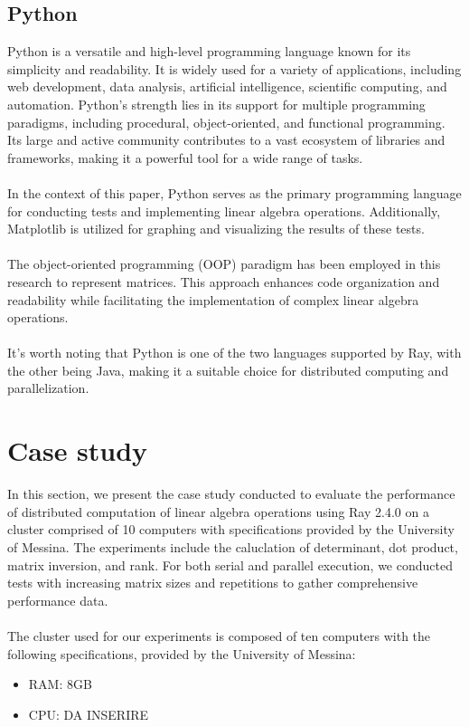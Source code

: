 \subsection{Python}
Python is a versatile and high-level programming language known for its simplicity and readability. It is widely used for a variety of applications, including web development, data analysis, artificial intelligence, scientific computing, and automation. Python's strength lies in its support for multiple programming paradigms, including procedural, object-oriented, and functional programming. Its large and active community contributes to a vast ecosystem of libraries and frameworks, making it a powerful tool for a wide range of tasks.
\\\\
In the context of this paper, Python serves as the primary programming language for conducting tests and implementing linear algebra operations. Additionally, Matplotlib is utilized for graphing and visualizing the results of these tests.
\\\\
The object-oriented programming (OOP) paradigm has been employed in this research to represent matrices. This approach enhances code organization and readability while facilitating the implementation of complex linear algebra operations.
\\\\
It's worth noting that Python is one of the two languages supported by Ray, with the other being Java, making it a suitable choice for distributed computing and parallelization.

\section{Case study}

In this section, we present the case study conducted to evaluate the performance of distributed computation of linear algebra operations using Ray 2.4.0 on a cluster comprised of 10 computers with specifications provided by the University of Messina. The experiments include the caluclation of determinant, dot product, matrix inversion, and rank. For both serial and parallel execution, we conducted tests with increasing matrix sizes and repetitions to gather comprehensive performance data.
\\\\
The cluster used for our experiments is composed of ten computers with the following specifications, provided by the University of Messina:
\begin{itemize}
    \item {RAM: 8GB}
    \item {CPU: DA INSERIRE}
\end{itemize}
\pagebreak
